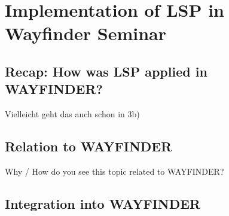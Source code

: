 \section{Implementation of LSP in Wayfinder Seminar}

\subsection{Recap: How was LSP applied in WAYFINDER?}
Vielleicht geht das auch schon in 3b)

\subsection{Relation to WAYFINDER}
Why / How do you see this topic related to WAYFINDER?

\subsection{Integration into WAYFINDER}

